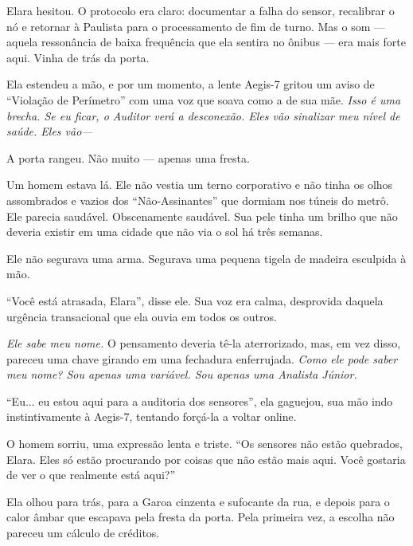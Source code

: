 Elara hesitou. O protocolo era claro: documentar a falha do sensor, recalibrar o nó e retornar à Paulista para o processamento de fim de turno. Mas o som --- aquela ressonância de baixa frequência que ela sentira no ônibus --- era mais forte aqui. Vinha de trás da porta.

Ela estendeu a mão, e por um momento, a lente Aegis-7 gritou um aviso de ``Violação de Perímetro'' com uma voz que soava como a de sua mãe. \textit{Isso é uma brecha. Se eu ficar, o Auditor verá a desconexão. Eles vão sinalizar meu nível de saúde. Eles vão—}

A porta rangeu. Não muito --- apenas uma fresta.

Um homem estava lá. Ele não vestia um terno corporativo e não tinha os olhos assombrados e vazios dos ``Não-Assinantes'' que dormiam nos túneis do metrô. Ele parecia saudável. Obscenamente saudável. Sua pele tinha um brilho que não deveria existir em uma cidade que não via o sol há três semanas.

Ele não segurava uma arma. Segurava uma pequena tigela de madeira esculpida à mão.

``Você está atrasada, Elara'', disse ele. Sua voz era calma, desprovida daquela urgência transacional que ela ouvia em todos os outros. 

\textit{Ele sabe meu nome.} O pensamento deveria tê-la aterrorizado, mas, em vez disso, pareceu uma chave girando em uma fechadura enferrujada. \textit{Como ele pode saber meu nome? Sou apenas uma variável. Sou apenas uma Analista Júnior.}

``Eu... eu estou aqui para a auditoria dos sensores'', ela gaguejou, sua mão indo instintivamente à Aegis-7, tentando forçá-la a voltar online. 

O homem sorriu, uma expressão lenta e triste. ``Os sensores não estão quebrados, Elara. Eles só estão procurando por coisas que não estão mais aqui. Você gostaria de ver o que realmente está aqui?''

Ela olhou para trás, para a Garoa cinzenta e sufocante da rua, e depois para o calor âmbar que escapava pela fresta da porta. Pela primeira vez, a escolha não pareceu um cálculo de créditos.
